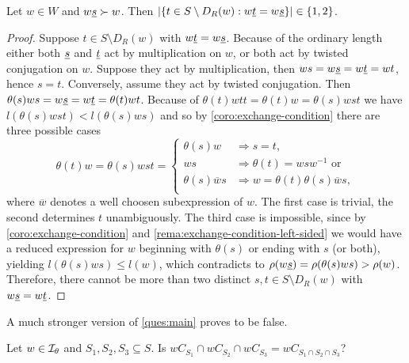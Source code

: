 \begin{prop}
	Let $w \in W$ and $w \underline{s} \succ w$. Then $|\{ t \in S \setminus D_R(w) : w \underline{t} = w \underline{s} \}| \in \{1,2\}$.

	\begin{proof}
		Suppose $t \in S \setminus D_R(w)$ with $w \underline{t} = w \underline{s}$. Because of the ordinary length either both $\underline{s}$ and $\underline{t}$ act by multiplication on $w$, or both act by twisted conjugation on $w$. Suppose they act by multiplication, then $ws = w \underline{s} = w \underline{t} = wt$, hence $s = t$. Conversely, assume they act by twisted conjugation. Then $\theta(s) w s = w \underline{s} = w \underline{t} = \theta(t)wt$. Because of $\theta(t) w t t = \theta(t) w = \theta(s) w s t$ we have $l(\theta(s) w s t) < l(\theta(s) w s)$ and so by \ref{coro:exchange-condition} there are three possible cases
		$$ \theta(t)w = \theta(s) w s t = \begin{cases}
			\theta(s) w & \Rightarrow s = t, \\
			w s & \Rightarrow \theta(t) = w s w^{-1} \textrm{ or} \\
			\theta(s) \overline w s & \Rightarrow w = \theta(t) \theta(s) \overline w s, \\
		\end{cases} $$
		where $\overline w$ denotes a well choosen subexpression of $w$. The first case is trivial, the second determines $t$ unambiguously. The third case is impossible, since by \ref{coro:exchange-condition} and \ref{rema:exchange-condition-left-sided} we would have a reduced expression for $w$ beginning with $\theta(s)$ or ending with $s$ (or both), yielding $l(\theta(s)ws) \leq l(w)$, which contradicts to $\rho(w \underline{s}) = \rho(\theta(s)ws) > \rho(w)$. Therefore, there cannot be more than two distinct $s,t \in S \setminus D_R(w)$ with $w \underline{s} = w \underline{t}$.
	\end{proof}
\end{prop}

A much stronger version of \ref{ques:main} proves to be false.

\begin{ques}
	Let $w \in \mathcal{I}_{\theta}$ and $S_1,S_2,S_3 \subseteq S$. Is $wC_{S_1} \cap wC_{S_2} \cap wC_{S_3} = wC_{S_1 \cap S_2 \cap S_3}$?
	\todo
\end{ques}

